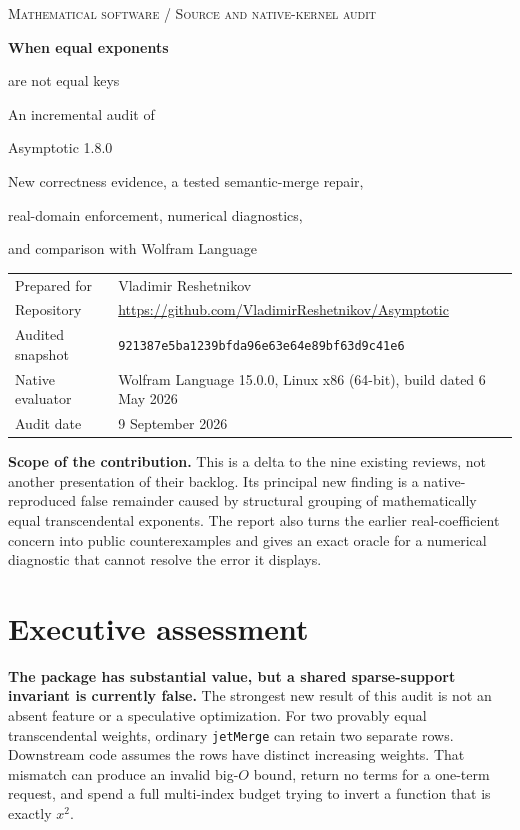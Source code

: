 \documentclass[11pt,letterpaper]{article}
\newcommand{\code}[1]{{\small\nolinkurl{#1}}}
\newcommand{\commit}{\texttt{921387e5ba1239bfda96e63e64e89bf63d9c41e6}}
\begin{document}
\begin{titlepage}
\vspace*{0.55in}
{\large\color{ink}\textsc{Mathematical software / Source and native-kernel audit}}\par
\vspace{0.35in}
{\Huge\bfseries When equal exponents\par are not equal keys}\par
\vspace{0.3in}
{\LARGE An incremental audit of\par Asymptotic 1.8.0}\par
\vspace{0.4in}
{\large New correctness evidence, a tested semantic-merge repair,\par real-domain enforcement, numerical diagnostics,\par and comparison with Wolfram Language}\par
\vspace{0.65in}
\begin{tabularx}{\linewidth}{@{}lX@{}}
Prepared for & Vladimir Reshetnikov\\[6pt]
Repository & \url{https://github.com/VladimirReshetnikov/Asymptotic}\\[6pt]
Audited snapshot & \commit\\[6pt]
Native evaluator & Wolfram Language 15.0.0, Linux x86 (64-bit), build dated 6 May 2026\\[6pt]
Audit date & 9 September 2026
\end{tabularx}
\vfill
\textbf{Scope of the contribution.} This is a delta to the nine existing reviews, not another presentation of their backlog. Its principal new finding is a native-reproduced false remainder caused by structural grouping of mathematically equal transcendental exponents. The report also turns the earlier real-coefficient concern into public counterexamples and gives an exact oracle for a numerical diagnostic that cannot resolve the error it displays.
\end{titlepage}

\section*{Executive assessment}
\textbf{The package has substantial value, but a shared sparse-support invariant is currently false.} The strongest new result of this audit is not an absent feature or a speculative optimization. For two provably equal transcendental weights, ordinary \code{jetMerge} can retain two separate rows. Downstream code assumes the rows have distinct increasing weights. That mismatch can produce an invalid big-$O$ bound, return no terms for a one-term request, and spend a full multi-index budget trying to invert a function that is exactly $x^2$.
\end{document}
